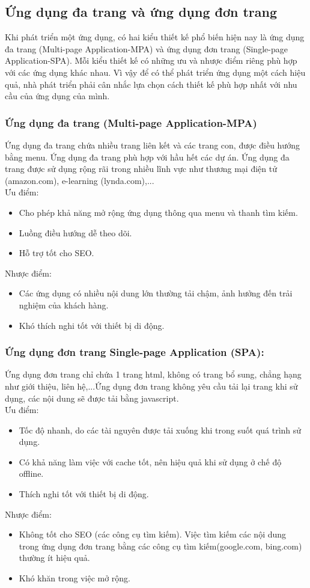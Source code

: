 \subsection{Ứng dụng đa trang và ứng dụng đơn trang}
Khi phát triển một ứng dụng, có hai kiểu thiết kế phổ biến hiện nay là ứng dụng đa trang (Multi-page Application-MPA) và ứng dụng đơn trang (Single-page Application-SPA). Mỗi kiểu thiết kế có những ưu và nhược điểm riêng phù hợp với các ứng dụng khác nhau. Vì vậy để có thể phát triển ứng dụng một cách hiệu quả, nhà phát triển phải cân nhắc lựa chọn cách thiết kế phù hợp nhất với nhu cầu của ứng dụng của mình.
\subsubsection{Ứng dụng đa trang (Multi-page Application-MPA)}
Ứng dụng đa trang chứa nhiều trang liên kết và các trang con, được điều hướng bằng menu. Ứng dụng đa trang phù hợp với hầu hết các dự án. Ứng dụng đa trang được sử dụng rộng rãi trong nhiều lĩnh vực như thương mại điện tử (amazon.com), e-learning (lynda.com),...\\
Ưu điểm:
\begin{itemize}
    \item Cho phép khả năng mở rộng ứng dụng thông qua menu và thanh tìm kiếm.
    \item Luồng điều hướng dễ theo dõi. 
    \item Hỗ trợ tốt cho SEO.
\end {itemize}
Nhược điểm:
\begin{itemize}
    \item Các ứng dụng có nhiều nội dung lớn thường tải chậm, ảnh hưởng đến trải nghiệm của khách hàng.
    \item Khó thích nghi tốt với thiết bị di động.
\end {itemize}
\subsubsection{Ứng dụng đơn trang Single-page Application (SPA):}
Ứng dụng đơn trang chỉ chứa 1 trang html, không có trang bổ sung, chẳng hạng như giới thiệu, liên hệ,...Ứng dụng đơn trang không yêu cầu tải lại trang khi sử dụng, các nội dung sẽ được tải bằng javascript.\\
Ưu điểm:
\begin{itemize}
    \item Tốc độ nhanh, do các tài nguyên được tải xuống khi trong suốt quá trình sử dụng.
    \item Có khả năng làm việc với cache tốt, nên hiệu quả khi sử dụng ở chế độ offline.
    \item Thích nghi tốt với thiết bị di động.
\end{itemize}
Nhược điểm:
\begin {itemize}
    \item Không tốt cho SEO (các công cụ tìm kiếm). Việc tìm kiếm các nội dung trong ứng dụng đơn trang bằng các công cụ tìm kiếm(google.com, bing.com) thường ít hiệu quả.
    \item Khó khăn trong việc mở rộng.
\end {itemize}
